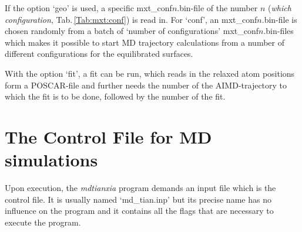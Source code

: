 \documentclass[twoside, 11pt, titlepage, captions=nooneline, a4paper, headsepline]{scrbook}%
\newcommand{\9}{\mathrm}
\newcommand{\0}{\,\mathrm}
\begin{document}
If the option `geo' is used, a specific mxt\_conf$n$.bin-file of the number $n$ (\textit{which configuration}, Tab.\,\ref{Tab:mxt:conf}) is read in. For `conf', an mxt\_conf$n$.bin-file is chosen randomly from a batch of `number of configurations' mxt\_conf$n$.bin-files which makes it possible to start MD trajectory calculations from a number of different configurations for the equilibrated surfaces.

With the option `fit', a fit can be run, which reads in the relaxed atom positions form a POSCAR-file and further needs the number of the AIMD-trajectory to which the fit is to be done, followed by the number of the fit.


\section{The Control File for MD simulations}
Upon execution, the \textit{mdtianxia} program demands an input file which is the control file. It is usually named `md\_tian.inp' but its precise name has no influence on the program and it contains all the flags that are necessary to execute the program.
\end{document}
